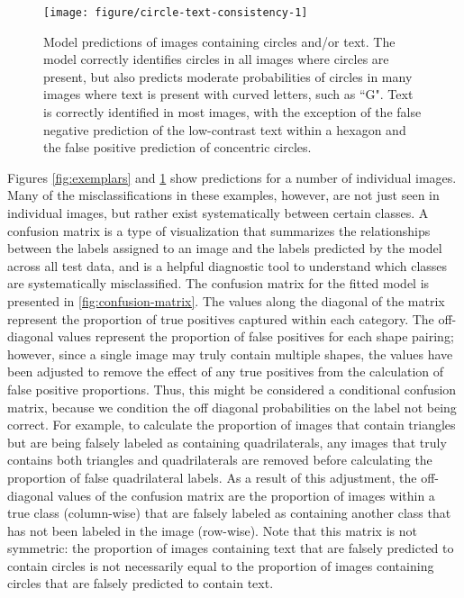 \documentclass{article}\usepackage[]{graphicx}\usepackage[table]{xcolor}
\newenvironment{knitrout}{}{} %
\begin{document}
\begin{knitrout}
\color{fgcolor}\begin{figure}[p!]

{\centering \texttt{[image: figure/circle-text-consistency-1]} 

}

\caption[Model predictions of images containing circles and/or text]{Model predictions of images containing circles and/or text. The model correctly identifies circles in all images where circles are present, but also predicts moderate probabilities of circles in many images where text is present with curved letters, such as ``G". Text is correctly identified in most images, with the exception of the false negative prediction of the low-contrast text within a hexagon and the false positive prediction of concentric circles.}\label{fig:circle-text-consistency}
\end{figure}


\end{knitrout}

Figures \ref{fig:exemplars} and \ref{fig:circle-text-consistency} show predictions for a number of individual images. Many of the misclassifications in these examples, however, are not just seen in individual images, but rather exist systematically between certain classes. A confusion matrix is a type of visualization that summarizes the relationships between the labels assigned to an image and the labels predicted by the model across all test data, and is a helpful diagnostic tool to understand which classes are systematically misclassified. The confusion matrix for the fitted model is presented in \autoref{fig:confusion-matrix}. The values along the diagonal of the matrix represent the proportion of true positives captured within each category. The off-diagonal values represent the proportion of false positives for each shape pairing; however, since a single image may truly contain multiple shapes, the values have been adjusted to remove the effect of any true positives from the calculation of false positive proportions. Thus, this might be considered a conditional confusion matrix, because we condition the off diagonal probabilities on the label not being correct. For example, to calculate the proportion of images that contain triangles but are being falsely labeled as containing quadrilaterals, any images that truly contains both triangles and quadrilaterals are removed before calculating the proportion of false quadrilateral labels. As a result of this adjustment, the off-diagonal values of the confusion matrix are the proportion of images within a true class (column-wise) that are falsely labeled as containing another class that has not been labeled in the image (row-wise). Note that this matrix is not symmetric: the proportion of images containing text that are falsely predicted to contain circles is not necessarily equal to the proportion of images containing circles that are falsely predicted to contain text.
\end{document}
